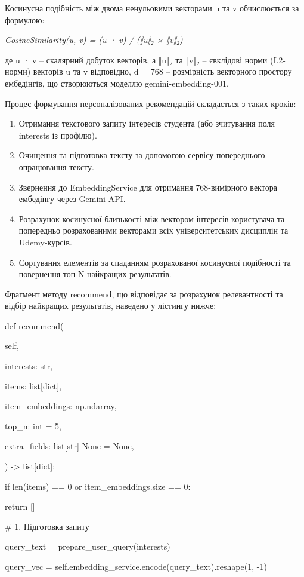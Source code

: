 \documentclass[
]{article}
\begin{document}
Косинусна подібність між двома ненульовими векторами u та v обчислюється
за формулою:

\emph{CosineSimilarity(u, v) = (u · v) / (‖u‖₂ × ‖v‖₂)}

де u · v -- скалярний добуток векторів, а ‖u‖₂ та ‖v‖₂ -- євклідові
норми (L2-норми) векторів u та v відповідно, d = 768 -- розмірність
векторного простору ембедінгів, що створюються моделлю
gemini-embedding-001.

Процес формування персоналізованих рекомендацій складається з таких
кроків:

\begin{enumerate}
\def\labelenumi{\arabic{enumi}.}
\item
  Отримання текстового запиту інтересів студента (або зчитування поля
  interests із профілю).
\item
  Очищення та підготовка тексту за допомогою сервісу попереднього
  опрацювання тексту.
\item
  Звернення до EmbeddingService для отримання 768-вимірного вектора
  ембедінгу через Gemini API.
\item
  Розрахунок косинусної близькості між вектором інтересів користувача та
  попередньо розрахованими векторами всіх університетських дисциплін та
  Udemy-курсів.
\item
  Сортування елементів за спаданням розрахованої косинусної подібності
  та повернення топ-N найкращих результатів.
\end{enumerate}

Фрагмент методу recommend, що відповідає за розрахунок релевантності та
відбір найкращих результатів, наведено у лістингу нижче:

def recommend(

self,

interests: str,

items: list{[}dict{]},

item\_embeddings: np.ndarray,

top\_n: int = 5,

extra\_fields: list{[}str{]} \textbar{} None = None,

) -\textgreater{} list{[}dict{]}:

if len(items) == 0 or item\_embeddings.size == 0:

return {[}{]}

\# 1. Підготовка запиту

query\_text = prepare\_user\_query(interests)

query\_vec = self.embedding\_service.encode(query\_text).reshape(1, -1)
\end{document}
